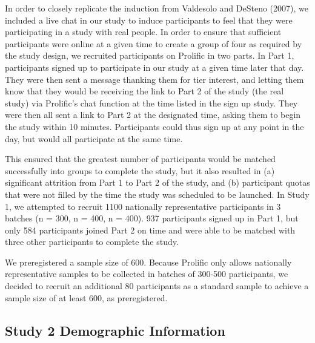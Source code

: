 \documentclass[12pt,]{article}
\begin{document}
In order to closely replicate the induction from Valdesolo and DeSteno (2007), we included a live chat in our study to induce participants to feel that they were participating in a study with real people. In order to ensure that sufficient participants were online at a given time to create a group of four as required by the study design, we recruited participants on Prolific in two parts. In Part 1, participants signed up to participate in our study at a given time later that day. They were then sent a message thanking them for tier interest, and letting them know that they would be receiving the link to Part 2 of the study (the real study) via Prolific's chat function at the time listed in the sign up study. They were then all sent a link to Part 2 at the designated time, asking them to begin the study within 10 minutes. Participants could thus sign up at any point in the day, but would all participate at the same time. 

This ensured that the greatest number of participants would be matched successfully into groups to complete the study, but it also resulted in (a) significant attrition from Part 1 to Part 2 of the study, and (b) participant quotas that were not filled by the time the study was scheduled to be launched. In Study 1,  we attempted to recruit 1100 nationally representative participants in 3 batches (n = 300, n = 400, n = 400). 937 participants signed up in Part 1, but only 584 participants joined Part 2 on time and were able to be matched with three other participants to complete the study.  

We preregistered a sample size of 600. Because Prolific only allows nationally representative samples to be collected in batches of 300-500 participants, we decided to recruit an additional 80 participants as a standard sample to achieve a sample size of at least 600, as preregistered. 



\clearpage
\subsection{Study 2 Demographic Information}
\label{appendix:recruit_2}
\end{document}

